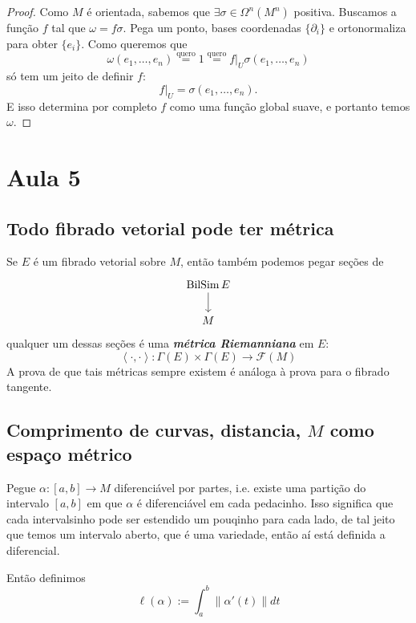 \begin{proof}\leavevmode
Como \(M\) é orientada, sabemos que \(\exists  \sigma \in \Omega^{n}(M^n)\) positiva. Buscamos a função \(f\) tal que \(\omega=f\sigma\). Pega um ponto, bases coordenadas \(\{\partial_i\}\) e ortonormaliza para obter \(\{e_i\}\). Como queremos que
\[\omega(e_1,\ldots,e_n)\overset{\text{quero}}{=}1\overset{\text{quero}}{=}f|_{U}\sigma(e_1,\ldots,e_n)\]
só tem um jeito de definir \(f\):
\[f|_{U}=\sigma(e_1,\ldots,e_n).\]
E isso determina por completo \(f\) como uma função global suave, e portanto temos \(\omega\).
\end{proof}

\section{Aula 5}

\subsection{Todo fibrado vetorial pode ter métrica}

\begin{remark}\leavevmode
Se \(E\) é um fibrado vetorial sobre \(M\), então também podemos pegar seções de
 \[\begin{tikzcd}
\operatorname{B i l Si m}E\arrow[d]\\
M
\end{tikzcd}\]
qualquer um dessas seções é uma \textit{\textbf{métrica Riemanniana}} em \(E\):
\[\left<\cdot,\cdot\right>: \Gamma(E)\times \Gamma(E)\longrightarrow \mathcal{F}(M)\]
A prova de que tais métricas sempre existem é análoga à prova para o fibrado tangente.
\end{remark}

\subsection{Comprimento de curvas, distancia, \(M\) como espaço métrico}

Pegue \(\alpha:[a,b]\longrightarrow M\) diferenciável por partes, i.e. existe uma partição do intervalo \([a,b]\) em que \(\alpha\) é diferenciável em cada pedacinho. Isso significa que cada intervalsinho pode ser estendido um pouqinho para cada lado, de tal jeito que temos um intervalo aberto, que é uma variedade, então aí está definida a diferencial.

Então definimos
\[\ell(\alpha):=\int_a^b \|\alpha'(t)\|dt\]

